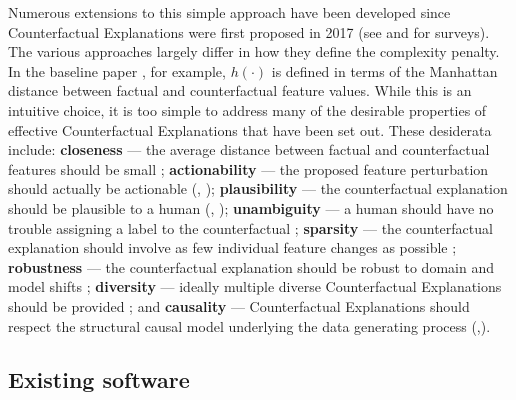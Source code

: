 \documentclass{juliacon}
\begin{document}
Numerous extensions to this simple approach have been developed since
Counterfactual Explanations were first proposed in 2017 (see
\cite{verma2020counterfactual} and \cite{karimi2020survey} for surveys).
The various approaches largely differ in how they define the complexity
penalty. In the baseline paper \cite{wachter2017counterfactual}, for
example, \(h(\cdot)\) is defined in terms of the Manhattan distance
between factual and counterfactual feature values. While this is an
intuitive choice, it is too simple to address many of the desirable
properties of effective Counterfactual Explanations that have been set
out. These desiderata include: \textbf{closeness} --- the average
distance between factual and counterfactual features should be small
\cite{wachter2017counterfactual}; \textbf{actionability} --- the
proposed feature perturbation should actually be actionable
(\cite{ustun2019actionable}, \cite{poyiadzi2020face});
\textbf{plausibility} --- the counterfactual explanation should be
plausible to a human (\cite{joshi2019realistic},
\cite{schut2021generating}); \textbf{unambiguity} --- a human should
have no trouble assigning a label to the counterfactual
\cite{schut2021generating}; \textbf{sparsity} --- the counterfactual
explanation should involve as few individual feature changes as possible
\cite{schut2021generating}; \textbf{robustness} --- the counterfactual
explanation should be robust to domain and model shifts
\cite{upadhyay2021robust}; \textbf{diversity} --- ideally multiple
diverse Counterfactual Explanations should be provided
\cite{mothilal2020explaining}; and \textbf{causality} --- Counterfactual
Explanations should respect the structural causal model underlying the
data generating process
(\cite{karimi2020algorithmic},\cite{karimi2021algorithmic}).

\hypertarget{existing-software}{%
\subsection{Existing software}\label{existing-software}}
\end{document}
